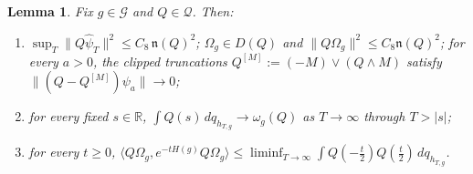 \documentclass[11pt,a4paper]{article}
\theoremstyle{plain}
\newtheorem{lemma}[theorem]{Lemma}
\theoremstyle{definition}
\newcommand{\R}{\mathbb{R}}
\newcommand{\G}{\mathcal{G}}
\newcommand{\Q}{\mathcal{Q}}
\newcommand{\Om}{\Omega}
\newcommand{\ip}[2]{\langle #1,#2\rangle}
\begin{document}
\begin{lemma}\label{lem:Gaux}
Fix $g\in\G$ and $Q\in\Q$. Then:
\begin{enumerate}
\item[\rm(i)] $\sup_T\|Q\hat\psi_T\|^2\le C_8\,\mathfrak n(Q)^2$;
      $\Om_g\in D(Q)$ and $\|Q\Om_g\|^2\le C_8\mathfrak n(Q)^2$;
      for every $a>0$, the clipped truncations
      $Q^{[M]}:=(-M)\vee(Q\wedge M)$ satisfy
      $\|(Q-Q^{[M]})\psi_a\|\to0$;
\item[\rm(ii)] for every fixed $s\in\R$,
      $\int Q(s)\,dq_{h_{T,g}}\to\omega_g(Q)$ as $T\to\infty$ through $T>|s|$;
\item[\rm(iii)] for every $t\ge0$,
      $\displaystyle
      \ip{Q\Om_g}{e^{-tH(g)}Q\Om_g}\le\liminf_{T\to\infty}\int Q(-\tfrac t2)Q(\tfrac t2)
      \,dq_{h_{T,g}}$.
\end{enumerate}
\end{lemma}
\end{document}
